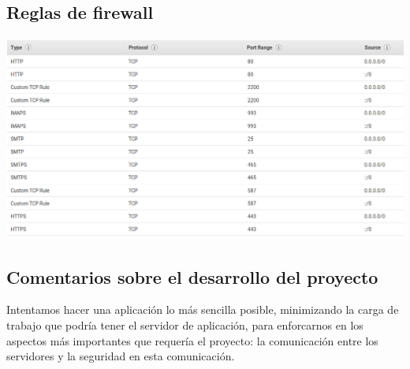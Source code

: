 \documentclass[12pt]{article}
\begin{document}
\subsection{Reglas de firewall}
\begin{center}
\includegraphics[scale=0.3]{mail/03} \\
\end{center}

\newpage

\subsection*{Comentarios sobre el desarrollo del proyecto}
Intentamos hacer una aplicación lo más sencilla posible, minimizando la carga de trabajo que podría tener el servidor de aplicación, para enforcarnos en los aspectos más importantes que requería el proyecto: la comunicación entre los servidores y la seguridad en esta comunicación. %
\end{document}
